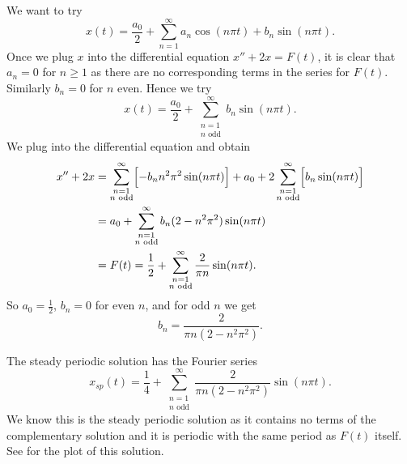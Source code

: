 \documentclass{ximera}
\begin{document}
\begin{exampleSol}
    We want to try
    \begin{equation*}
        x(t) = \frac{a_0}{2} + \sum_{n=1}^\infty a_n \cos (n \pi t) + b_n \sin (n \pi t) .
    \end{equation*}
    Once we plug $x$ into the differential equation $x''+2x = F(t)$, it is clear that $a_n = 0$ for $n \geq 1$ as there are no corresponding terms in the series for $F(t)$.  Similarly $b_n = 0$ for $n$ even.  Hence we try
    \begin{equation*}
        x(t) = \frac{a_0}{2} + \sum_{\substack{n=1 \\ 
        n \text{ odd}}}^\infty b_n \sin (n \pi t) .
    \end{equation*}
    We plug into the differential equation and obtain
    \begin{equation*}
        \begin{split}
            x'' + 2 x & = \sum_{\substack{n=1 \\ 
            n \text{ odd}}}^\infty \Bigl[ - b_n n^2 \pi^2 \sin (n \pi t) \Bigr] + 
            a_0 + 2 \sum_{\substack{n=1 \\ 
            n \text{ odd}}}^\infty \Bigl[ b_n \sin (n \pi t) \Bigr] \\
            & = a_0 + \sum_{\substack{n=1 \\ 
            n \text{ odd}}}^\infty b_n (2 - n^2 \pi^2 ) \sin (n \pi t) \\
            & = F(t) = \frac{1}{2} + \sum_{\substack{n=1 \\ 
            n \text{ odd}}}^\infty \frac{2}{\pi n} \sin (n \pi t) .
        \end{split}
    \end{equation*}
    So $a_0 = \frac{1}{2}$, $b_n = 0$ for even $n$, and for odd $n$ we get
    \begin{equation*}
        b_n = \frac{2}{\pi n (2 - n^2 \pi^2 )} .
    \end{equation*}
    
    The steady periodic solution has the Fourier series
    \begin{equation*}
        x_{sp}(t) = \frac{1}{4} + \sum_{\substack{n=1 \\ n \text{ odd}}}^\infty \frac{2}{\pi n (2 - n^2 \pi^2 )}\sin (n \pi t) .
    \end{equation*}
    We know this is the steady periodic solution as it contains no terms of the complementary solution and it is periodic with the same period as $F(t)$ itself.  See  for the plot of this solution.
    \begin{myfig}
        \capstart
        \caption{Plot of the steady periodic solution $x_{sp}$ of
        .%
        \label{afs:steadyexfig}}
    \end{myfig}
\end{exampleSol}
\end{document}
